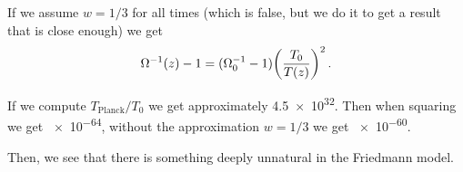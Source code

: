 \documentclass[main.tex]{subfiles}
\begin{document}
If we assume \(w = 1/3\) for all times (which is false, but we do it to get a result that is close enough) we get 
%
\begin{align}
  \Omega ^{-1} (z) -1= (\Omega_0 ^{-1} -1) \qty(\frac{T_0 }{T(z)})^{2}
\,.
\end{align}

If we compute \(T _{\text{Planck}} / T_0 \) we get approximately \num{4.5e32}. Then when squaring we get \num{e-64}, without the approximation \(w=1/3\) we get \num{e-60}.

Then, we see that there is something deeply unnatural in the Friedmann model.
\end{document}
